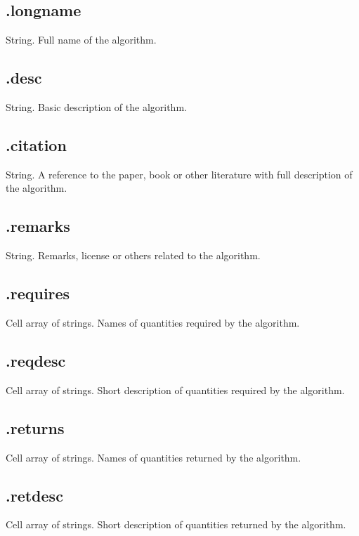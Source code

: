 \documentclass[12pt]{article} %
\begin{document}
\subsection{\textsf{.longname}} %
String. Full name of the algorithm. 

\subsection{\textsf{.desc}} %
String. Basic description of the algorithm.

\subsection{\textsf{.citation}} %
String. A reference to the paper, book or other literature with full description of the algorithm.

\subsection{\textsf{.remarks}} %
String. Remarks, license or others related to the algorithm.

\subsection{\textsf{.requires}} %
Cell array of strings. Names of quantities required by the algorithm.

\subsection{\textsf{.reqdesc}} %
Cell array of strings. Short description of quantities required by the algorithm.

\subsection{\textsf{.returns}} %
Cell array of strings. Names of quantities returned by the algorithm.

\subsection{\textsf{.retdesc}} %
Cell array of strings. Short description of quantities returned by the algorithm.
\end{document}
